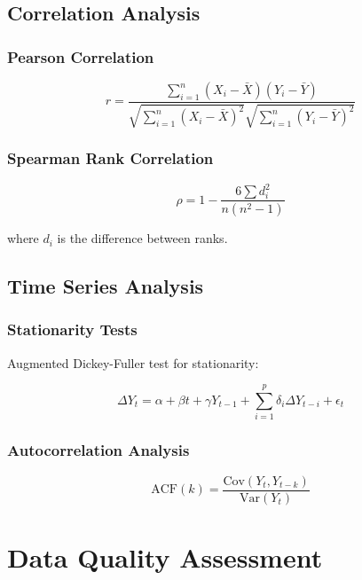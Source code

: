\documentclass[12pt,a4paper]{article}
\begin{document}
\subsection{Correlation Analysis}

\subsubsection{Pearson Correlation}

\begin{equation}
r = \frac{\sum_{i=1}^{n} (X_i - \bar{X})(Y_i - \bar{Y})}{\sqrt{\sum_{i=1}^{n} (X_i - \bar{X})^2} \sqrt{\sum_{i=1}^{n} (Y_i - \bar{Y})^2}}
\end{equation}

\subsubsection{Spearman Rank Correlation}

\begin{equation}
\rho = 1 - \frac{6 \sum d_i^2}{n(n^2-1)}
\end{equation}

where $d_i$ is the difference between ranks.

\subsection{Time Series Analysis}

\subsubsection{Stationarity Tests}

Augmented Dickey-Fuller test for stationarity:

\begin{equation}
\Delta Y_t = \alpha + \beta t + \gamma Y_{t-1} + \sum_{i=1}^{p} \delta_i \Delta Y_{t-i} + \epsilon_t
\end{equation}

\subsubsection{Autocorrelation Analysis}

\begin{equation}
\text{ACF}(k) = \frac{\text{Cov}(Y_t, Y_{t-k})}{\text{Var}(Y_t)}
\end{equation}

\section{Data Quality Assessment}
\end{document}
